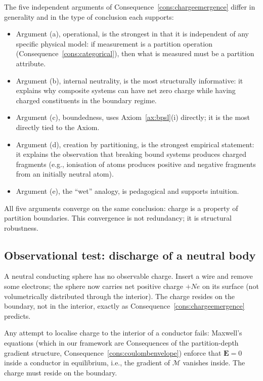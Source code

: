 \documentclass[11pt,twocolumn,a4paper]{article}
\theoremstyle{axiomstyle}
\theoremstyle{conseqstyle}
\theoremstyle{definition}
\theoremstyle{remark}
\newcommand{\Depth}{\mathcal{M}}
\begin{document}
The five independent arguments of Consequence~\ref{cons:chargeemergence} differ in generality and in the type of conclusion each supports:
\begin{itemize}
\item Argument (a), operational, is the strongest in that it is independent of any specific physical model: if measurement is a partition operation (Consequence~\ref{cons:categorical}), then what is measured must be a partition attribute.
\item Argument (b), internal neutrality, is the most structurally informative: it explains why composite systems can have net zero charge while having charged constituents in the boundary regime.
\item Argument (c), boundedness, uses Axiom~\ref{ax:bpsl}(i) directly; it is the most directly tied to the Axiom.
\item Argument (d), creation by partitioning, is the strongest empirical statement: it explains the observation that breaking bound systems produces charged fragments (e.g., ionisation of atoms produces positive and negative fragments from an initially neutral atom).
\item Argument (e), the ``wet'' analogy, is pedagogical and supports intuition.
\end{itemize}

All five arguments converge on the same conclusion: charge is a property of partition boundaries. This convergence is not redundancy; it is structural robustness.

\subsection{Observational test: discharge of a neutral body}

A neutral conducting sphere has no observable charge. Insert a wire and remove some electrons; the sphere now carries net positive charge $+Ne$ on its surface (not volumetrically distributed through the interior). The charge resides on the boundary, not in the interior, exactly as Consequence~\ref{cons:chargeemergence} predicts.

Any attempt to localise charge to the interior of a conductor fails: Maxwell's equations (which in our framework are Consequences of the partition-depth gradient structure, Consequence~\ref{cons:coulombenvelope}) enforce that $\mathbf{E}=0$ inside a conductor in equilibrium, i.e., the gradient of $\Depth$ vanishes inside. The charge must reside on the boundary.
\end{document}
